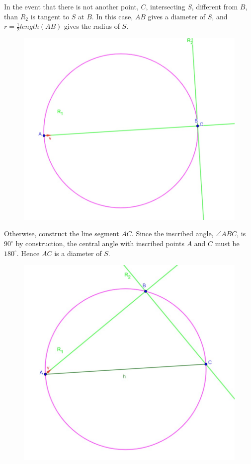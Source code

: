 \documentclass[11pt]{article}
\begin{document}
In the event that there is not another point, \(C\), intersecting \(S\), different from \(B\), than \(R_2\) is tangent to \(S\) at \(B\).  In this case, \(AB\) gives a diameter of \(S\), and \(r=\frac{1}{2}length(AB)\) gives the radius of \(S\).
\begin{center}
	\begin{figure}[h]
		\includegraphics[scale=0.5]{circle_5_b.jpg}
	\end{figure}
\end{center}
Otherwise, construct the line segment \(AC\).  Since the inscribed angle, \(\angle ABC\), is \(90^{\circ}\) by construction, the central angle with inscribed points \(A\) and \(C\) must be \(180^{\circ}\).  Hence \(AC\) is a diameter of \(S\). 
\begin{center}
	\begin{figure}[h]
		\includegraphics[scale=0.5]{circle_6.jpg}
	\end{figure}
\end{center}
\end{document}
